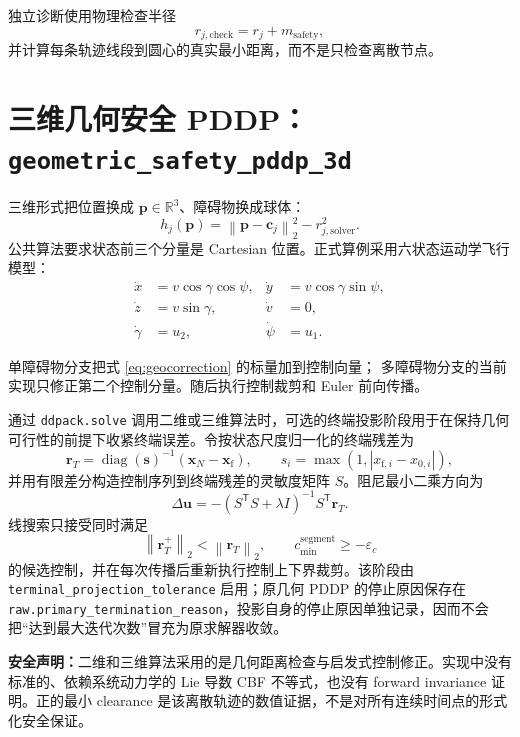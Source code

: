 \documentclass[UTF8,zihao=-4,openany,fontset=fandol]{ctexbook}
\newcommand{\code}[1]{\nolinkurl{#1}}
\newcommand{\R}{\mathbb{R}}
\newcommand{\normtwo}[1]{\left\lVert #1\right\rVert_2}
\newcommand{\important}[1]{%
  \begin{center}
  \colorbox{ddlight}{\parbox{0.91\textwidth}{#1}}
  \end{center}}
\begin{document}
独立诊断使用物理检查半径
\[
  r_{j,\mathrm{check}}=r_j+m_{\mathrm{safety}},
\]
并计算每条轨迹线段到圆心的真实最小距离，而不是只检查离散节点。

\section{三维几何安全 PDDP：\texorpdfstring{\texttt{geometric\_safety\_pddp\_3d}}{geometric-safety-pddp-3d}}

三维形式把位置换成 $\bm{p}\in\R^3$、障碍物换成球体：
\begin{equation}
  h_j(\bm{p})
  =
  \normtwo{\bm{p}-\bm{c}_j}^2-r_{j,\mathrm{solver}}^2.
\end{equation}
公共算法要求状态前三个分量是 Cartesian 位置。正式算例采用六状态运动学飞行模型：
\begin{align}
  \dot{x}&=v\cos\gamma\cos\psi,&
  \dot{y}&=v\cos\gamma\sin\psi,\\
  \dot{z}&=v\sin\gamma,&
  \dot{v}&=0,\\
  \dot{\gamma}&=u_2,&
  \dot{\psi}&=u_1.
\end{align}

单障碍物分支把式 \eqref{eq:geocorrection} 的标量加到控制向量；
多障碍物分支的当前实现只修正第二个控制分量。随后执行控制裁剪和 Euler 前向传播。

通过 \code{ddpack.solve} 调用二维或三维算法时，可选的终端投影阶段用于在保持几何可行性的前提下收紧终端误差。令按状态尺度归一化的终端残差为
\begin{equation}
  \bm r_T=\operatorname{diag}(\bm s)^{-1}
  (\bm x_N-\bm x_{\mathrm f}),\qquad
  s_i=\max(1,|x_{\mathrm f,i}-x_{0,i}|),
\end{equation}
并用有限差分构造控制序列到终端残差的灵敏度矩阵 $S$。阻尼最小二乘方向为
\begin{equation}
  \Delta\bm u=-(S^\mathsf{T}S+\lambda I)^{-1}S^\mathsf{T}\bm r_T.
\end{equation}
线搜索只接受同时满足
\begin{equation}
  \normtwo{\bm r_T^+}<\normtwo{\bm r_T},\qquad
  c_{\min}^{\mathrm{segment}}\ge-\varepsilon_c
\end{equation}
的候选控制，并在每次传播后重新执行控制上下界裁剪。该阶段由
\code{terminal_projection_tolerance} 启用；原几何 PDDP 的停止原因保存在
\code{raw.primary_termination_reason}，投影自身的停止原因单独记录，因而不会把“达到最大迭代次数”冒充为原求解器收敛。

\important{\textbf{安全声明：}二维和三维算法采用的是几何距离检查与启发式控制修正。实现中没有标准的、依赖系统动力学的 Lie 导数 CBF 不等式，也没有 forward invariance 证明。正的最小 clearance 是该离散轨迹的数值证据，不是对所有连续时间点的形式化安全保证。}
\end{document}
